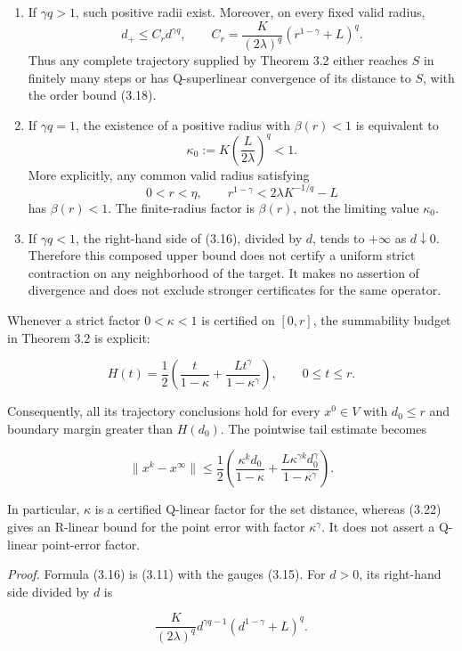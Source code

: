 \documentclass[11pt,a4paper]{article}
\theoremstyle{plain}
\theoremstyle{definition}
\theoremstyle{remark}
\begin{document}
\begin{enumerate}
\def\labelenumi{\arabic{enumi}.}
\item
  If \(\gamma q>1\), such positive radii exist. Moreover, on every fixed
  valid radius, \[
  d_+\le C_r d^{\gamma q},
  \qquad
  C_r=\frac{K}{(2\lambda)^q}(r^{1-\gamma}+L)^q.
  \tag{3.18}
  \] Thus any complete trajectory supplied by Theorem 3.2 either reaches
  \(S\) in finitely many steps or has Q-superlinear convergence of its
  distance to \(S\), with the order bound (3.18).
\item
  If \(\gamma q=1\), the existence of a positive radius with
  \(\beta(r)<1\) is equivalent to \[
  \kappa_0:=K\left(\frac{L}{2\lambda}\right)^q<1.
  \tag{3.19}
  \] More explicitly, any common valid radius satisfying \[
  0<r<\eta,
  \qquad
  r^{1-\gamma}<2\lambda K^{-1/q}-L
  \tag{3.20}
  \] has \(\beta(r)<1\). The finite-radius factor is \(\beta(r)\), not
  the limiting value \(\kappa_0\).
\item
  If \(\gamma q<1\), the right-hand side of (3.16), divided by \(d\),
  tends to \(+\infty\) as \(d\downarrow0\). Therefore this composed
  upper bound does not certify a uniform strict contraction on any
  neighborhood of the target. It makes no assertion of divergence and
  does not exclude stronger certificates for the same operator.
\end{enumerate}

Whenever a strict factor \(0<\kappa<1\) is certified on \([0,r]\), the
summability budget in Theorem 3.2 is explicit:

\[
H(t)=\frac12\left(
\frac{t}{1-\kappa}
+\frac{Lt^\gamma}{1-\kappa^\gamma}
\right),\qquad 0\le t\le r.
\tag{3.21}
\]

Consequently, all its trajectory conclusions hold for every \(x^0\in V\)
with \(d_0\le r\) and boundary margin greater than \(H(d_0)\). The
pointwise tail estimate becomes

\[
\|x^k-x^\infty\|
\le\frac12\left(
\frac{\kappa^k d_0}{1-\kappa}
+\frac{L\kappa^{\gamma k}d_0^\gamma}{1-\kappa^\gamma}
\right).
\tag{3.22}
\]

In particular, \(\kappa\) is a certified Q-linear factor for the set
distance, whereas (3.22) gives an R-linear bound for the point error
with factor \(\kappa^\gamma\). It does not assert a Q-linear point-error
factor.

\emph{Proof.} Formula (3.16) is (3.11) with the gauges (3.15). For
\(d>0\), its right-hand side divided by \(d\) is

\[
\frac{K}{(2\lambda)^q}
d^{\gamma q-1}(d^{1-\gamma}+L)^q.
\tag{3.23}
\]
\end{document}
